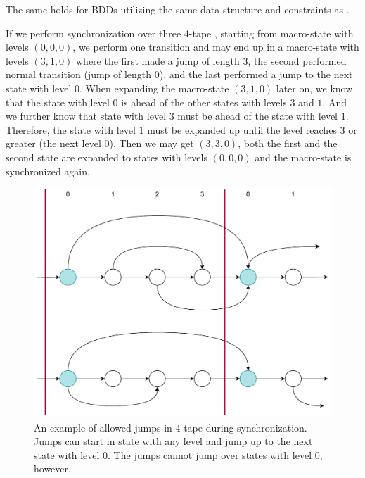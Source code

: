 The same holds for BDDs utilizing the same data structure and constraints as \nfts.

\begin{example}
  If we perform synchronization over three $4$-tape \nfts, starting from macro-state with levels $(0, 0, 0)$, we perform one transition and may end up in a macro-state with levels $(3, 1, 0)$ where the first \nft made a jump of length $3$, the second performed normal transition (jump of length $0$), and the last \nft performed a jump to the next state with level $0$.
  When expanding the macro-state $(3, 1, 0)$ later on, we know that the state with level $0$ is ahead of the other states with levels $3$ and $1$. And we further know that state with level $3$ must be ahead of the state with level $1$. Therefore, the state with level $1$ must be expanded up until the level reaches $3$ or greater (the next level $0$).
  Then we may get $(3, 3, 0)$, both the first and the second state are expanded to states with levels $(0, 0, 0)$ and the macro-state is synchronized again.
\end{example}

\begin{figure}[ht]
  \centering
  \includegraphics[scale=0.7, keepaspectratio]{obrazky-figures/jumps_synchronization.drawio.pdf}
  \caption{
    An example of allowed jumps in $4$-tape \nfts during synchronization.
    Jumps can start in state with any level and jump up to the next state with level $0$.
    The jumps cannot jump over states with level $0$, however.
  }

\end{figure}


